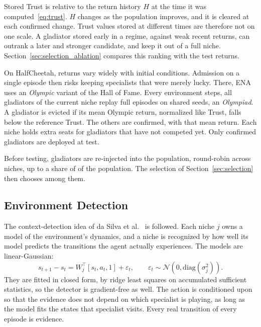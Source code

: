 Stored Trust is relative to the return history $H$ at the time it was computed~\eqref{eq:trust}. $H$ changes as the population improves, and it is cleared at each confirmed change. Trust values stored at different times are therefore not on one scale. A gladiator stored early in a regime, against weak recent returns, can outrank a later and stronger candidate, and keep it out of a full niche. Section~\ref{sec:selection_ablation} compares this ranking with the test returns.

On HalfCheetah, returns vary widely with initial conditions. Admission on a single episode then risks keeping specialists that were merely lucky. There, ENA uses an \textit{Olympic} variant of the Hall of Fame. Every  environment steps, all gladiators of the current niche replay  full episodes on shared seeds, an \textit{Olympiad}. A gladiator is evicted if its mean Olympic return, normalized like Trust, falls below the reference Trust. The others are confirmed, with that mean return. Each niche holds  extra seats for gladiators that have not competed yet. Only confirmed gladiators are deployed at test.

Before testing, gladiators are re-injected into the population, round-robin across niches, up to a share of  of the population. The selection of Section~\ref{sec:selection} then chooses among them.

\subsection{Environment Detection}
\label{sec:detection}
The context-detection idea of da Silva et al.~\cite{dasilva2006dealing} is followed. Each niche $j$ owns a model of the environment's dynamics, and a niche is recognized by how well its model predicts the transitions the agent actually experiences. The models are linear-Gaussian:
\begin{equation}
s_{t+1} - s_t = W_j^{\top}[s_t, a_t, 1] + \varepsilon_t, \qquad \varepsilon_t \sim \mathcal{N}\!\left(0, \mathrm{diag}(\sigma_j^2)\right).
\label{eq:dynamics}
\end{equation}
They are fitted in closed form, by ridge least squares on accumulated sufficient statistics, so the detector is gradient-free as well. The action is conditioned upon so that the evidence does not depend on which specialist is playing, as long as the model fits the states that specialist visits. Every real transition of every episode is evidence.

